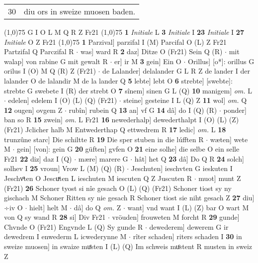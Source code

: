 \documentclass[8pt,a4paper,notitlepage]{article}
\begin{document}
\begin{table}[ht]
\begin{minipage}[t]{0.5\linewidth}
\begin{tabular}{rl}
30 & diu ors in sweize muosen baden.\\ 
\end{tabular}
\scriptsize
\line(1,0){75} \newline
G I O L M Q R Z Fr21 \newline
\line(1,0){75} \newline
\textbf{1} \textit{Initiale} L  \textbf{3} \textit{Initiale} I  \textbf{23} \textit{Initiale} I  \textbf{27} \textit{Initiale} O Z Fr21  \newline
\line(1,0){75} \newline
\textbf{1} Parzival] parzifal I (M) Parcifal O (L) Z Fr21 Partzifal Q Parczifal R  $\cdot$ was] ward R \textbf{2} daz] Ditze O (Fr21) Sein Q (R)  $\cdot$ mit walap] von rabine G mit gewalt R  $\cdot$ er] ir M \textbf{3} gein] Ein O  $\cdot$ Orillus] [o*]: orillus G orilus I (O) M Q (R) Z (Fr21)  $\cdot$ de Lalander] delalander G L R Z de lander I der lalander O de lalandir M de la lander Q \textbf{5} lebte] lebt O \textbf{6} strebte] [swebte]: strebte G swebete I (R) der strebt O \textbf{7} sînem] sinen G L (Q) \textbf{10} manigem] \textit{om.} L  $\cdot$ edelen] edelem I (O) (L) (Q) (Fr21)  $\cdot$ steine] gesteine I L (Q) Z \textbf{11} wol] \textit{om.} Q \textbf{12} ougen] ovgem Z  $\cdot$ rubîn] rubein Q \textbf{13} an] vf G \textbf{14} dâ] do I (Q) (R)  $\cdot$ ponder] ban so R \textbf{15} zwein] \textit{om.} L Fr21 \textbf{16} newederhalp] dewederthalpt I (O) (L) (Z) (Fr21) Jclicher halb M Entwederthap Q ettwedrem R \textbf{17} ledic] \textit{om.} L \textbf{18} trunzûne starc] Die schiltte R \textbf{19} Die sper stuben in die lúfften R  $\cdot$ wæten] wete M  $\cdot$ gein] [von]: gein G \textbf{20} güften] gvfen O \textbf{21} eine solhe] die selbe O ein selle Fr21 \textbf{22} diz] daz I (Q)  $\cdot$ mære] marere G  $\cdot$ hât] het Q \textbf{23} dâ] Do Q R \textbf{24} solch] solhev I \textbf{25} vroun] Vrow L (M) (Q) (R)  $\cdot$ Jeschuten] ieschvten G ieskuten I Jeschvͦten O Jescuͯten L ieschuten M iescuten Q Z Juscuten R  $\cdot$ muot] munt Z (Fr21) \textbf{26} Schoner tyost si nîe gesach O (L) (Q) (Fr21) Schoner tiost sy ny gischach M Schoner Ritten sy nie gesach R Schoner tiost sie niht gesach Z \textbf{27} diu] ÷iv O  $\cdot$ hielt] helt M  $\cdot$ dâ] do Q \textit{om.} Z  $\cdot$ want] vnd want I (L) (Z) bar O wart M von Q sy wand R \textbf{28} si] Div Fr21  $\cdot$ vröuden] frouweten M forcht R \textbf{29} gunde] Chvnde O (Fr21) Engvnde L (Q) Sy gunde R  $\cdot$ dewederem] dewerem G ir dewedrem I enwederm L icwederynne M  $\cdot$ rîter schaden] riters schaden I \textbf{30} in sweize muosen] in swaize muͤsten I (L) (Q) Im schweis muͦstent R musten in sweiz Z \newline

\end{minipage}
\end{table}
\end{document}
